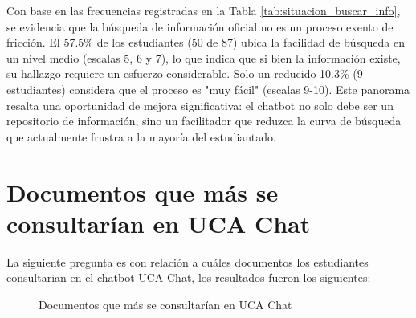 {{        Con base en las frecuencias registradas en la Tabla \ref{tab:situacion_buscar_info}, se evidencia que la búsqueda de información oficial no es un proceso exento de fricción. El 57.5\% de los estudiantes (50 de 87) ubica la facilidad de búsqueda en un nivel medio (escalas 5, 6 y 7), lo que indica que si bien la información existe, su hallazgo requiere un esfuerzo considerable. Solo un reducido 10.3\% (9 estudiantes) considera que el proceso es "muy fácil" (escalas 9-10). Este panorama resalta una oportunidad de mejora significativa: el chatbot no solo debe ser un repositorio de información, sino un facilitador que reduzca la curva de búsqueda que actualmente frustra a la mayoría del estudiantado.

\section{Documentos que más se consultarían en UCA Chat}
La siguiente pregunta es con relación a cuáles documentos los estudiantes consultarian en el chatbot UCA Chat, los resultados fueron los siguientes:


\begin{figure}[H]
    \centering
    \caption{Documentos que más se consultarían en UCA Chat}
    \label{fig:docs_ucachat}
\end{figure}

}}
